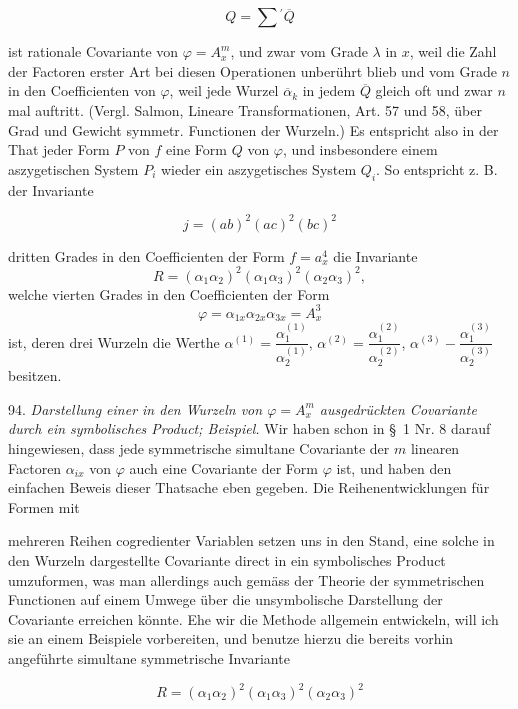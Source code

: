 \documentclass[11pt]{article}
\providecommand{\gesperrt}[1]{\textls[130]{#1}}
\providecommand{\weberpage}[1]{}
\begin{document}
\[
Q=\sum{}^{\prime}\overline{Q}
\]

ist rationale Covariante von $\varphi=A_x^m$, und zwar vom Grade $\lambda$ in $x$, weil die Zahl der Factoren erster Art bei diesen Operationen unberührt blieb und vom Grade $n$ in den Coefficienten von $\varphi$, weil jede Wurzel $\overline{\alpha}_k$ in jedem $\overline{Q}$ gleich oft und zwar $n$ mal auftritt. (Vergl. Salmon, Lineare Transformationen, Art. 57 und 58, über Grad und Gewicht symmetr. Functionen der Wurzeln.) Es entspricht also in der That jeder Form $P$ von $f$ eine Form $Q$ von $\varphi$, und insbesondere einem aszygetischen System $P_i$ wieder ein aszygetisches System $Q_i$. So entspricht z. B. der Invariante

\[
j=(ab)^2(ac)^2(bc)^2
\]

dritten Grades in den Coefficienten der Form $f=a_x^4$ die Invariante
\[
R=(\alpha_1\alpha_2)^2(\alpha_1\alpha_3)^2(\alpha_2\alpha_3)^2,
\]
welche vierten Grades in den Coefficienten der Form
\[
\varphi=\alpha_{1x}\alpha_{2x}\alpha_{3x}=A_x^3
\]
ist, deren drei Wurzeln die Werthe $\alpha^{(1)}=\dfrac{\alpha_1^{(1)}}{\alpha_2^{(1)}}$, $\alpha^{(2)}=\dfrac{\alpha_1^{(2)}}{\alpha_2^{(2)}}$, $\alpha^{(3)}-\dfrac{\alpha_1^{(3)}}{\alpha_2^{(3)}}$ %
besitzen.

94. \textit{Darstellung einer in den Wurzeln von $\varphi=A_x^m$ ausgedrückten Covariante durch ein symbolisches Product; Beispiel.} Wir haben schon in \S~1 Nr. 8 darauf hingewiesen, dass jede symmetrische simultane Covariante der $m$ linearen Factoren $\alpha_{ix}$ von $\varphi$ auch eine \gesperrt{rationale} Covariante der Form $\varphi$ ist, und haben den einfachen Beweis dieser Thatsache eben gegeben. Die Reihenentwicklungen für Formen mit


\weberpage{99}
mehreren Reihen cogredienter Variablen setzen uns in den Stand, eine solche in den Wurzeln dargestellte Covariante direct in ein symbolisches Product umzuformen, was man allerdings auch gemäss der Theorie der symmetrischen Functionen auf einem Umwege über die unsymbolische Darstellung der Covariante erreichen könnte. Ehe wir die Methode allgemein entwickeln, will ich sie an einem Beispiele vorbereiten, und benutze hierzu die bereits vorhin angeführte simultane symmetrische Invariante

\[
R=(\alpha_1\alpha_2)^2(\alpha_1\alpha_3)^2(\alpha_2\alpha_3)^2
\]
\end{document}
